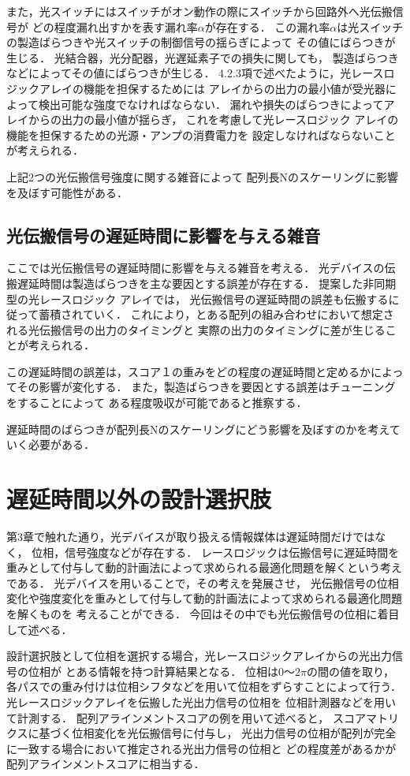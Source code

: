 また，光スイッチにはスイッチがオン動作の際にスイッチから回路外へ光伝搬信号が
どの程度漏れ出すかを表す漏れ率$\alpha$が存在する．
この漏れ率$\alpha$は光スイッチの製造ばらつきや光スイッチの制御信号の揺らぎによって
その値にばらつきが生じる．
光結合器，光分配器，光遅延素子での損失に関しても，
製造ばらつきなどによってその値にばらつきが生じる．
4.2.3項で述べたように，光レースロジックアレイの機能を担保するためには
アレイからの出力の最小値が受光器によって検出可能な強度でなければならない．
漏れや損失のばらつきによってアレイからの出力の最小値が揺らぎ，
これを考慮して光レースロジック アレイの機能を担保するための光源・アンプの消費電力を
設定しなければならないことが考えられる．

上記2つの光伝搬信号強度に関する雑音によって
配列長Nのスケーリングに影響を及ぼす可能性がある．

\subsection{光伝搬信号の遅延時間に影響を与える雑音}
ここでは光伝搬信号の遅延時間に影響を与える雑音を考える．
光デバイスの伝搬遅延時間は製造ばらつきを主な要因とする誤差が存在する．
提案した非同期型の光レースロジック アレイでは，
光伝搬信号の遅延時間の誤差も伝搬するに従って蓄積されていく．
これにより，とある配列の組み合わせにおいて想定される光伝搬信号の出力のタイミングと
実際の出力のタイミングに差が生じることが考えられる．

この遅延時間の誤差は，スコア１の重みをどの程度の遅延時間と定めるかによってその影響が変化する．
また，製造ばらつきを要因とする誤差はチューニングをすることによって
ある程度吸収が可能であると推察する．

遅延時間のばらつきが配列長Nのスケーリングにどう影響を及ぼすのかを考えていく必要がある．

\section{遅延時間以外の設計選択肢}
第3章で触れた通り，光デバイスが取り扱える情報媒体は遅延時間だけではなく，
位相，信号強度などが存在する．
レースロジックは伝搬信号に遅延時間を重みとして付与して動的計画法によって求められる最適化問題を解くという考えである．
光デバイスを用いることで，その考えを発展させ，
光伝搬信号の位相変化や強度変化を重みとして付与して動的計画法によって求められる最適化問題を解くものを
考えることができる．
今回はその中でも光伝搬信号の位相に着目して述べる．

設計選択肢として位相を選択する場合，光レースロジックアレイからの光出力信号の位相が
とある情報を持つ計算結果となる．
位相は$0〜2\pi$の間の値を取り，
各パスでの重み付けは位相シフタなどを用いて位相をずらすことによって行う．
光レースロジックアレイを伝搬した光出力信号の位相を
位相計測器などを用いて計測する．
配列アラインメントスコアの例を用いて述べると，
スコアマトリクスに基づく位相変化を光伝搬信号に付与し，
光出力信号の位相が配列が完全に一致する場合において推定される光出力信号の位相と
どの程度差があるかが配列アラインメントスコアに相当する．

